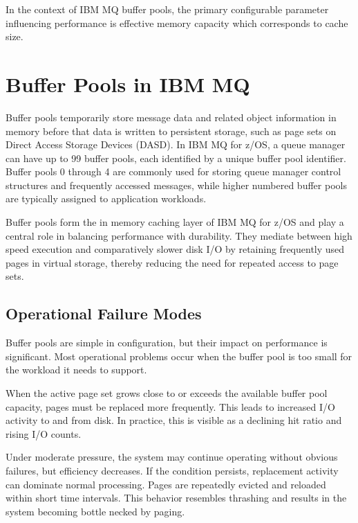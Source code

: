 In the context of IBM MQ buffer pools, the primary configurable parameter influencing performance is effective memory capacity which corresponds to cache size.

\section{Buffer Pools in IBM MQ}%
\label{sec:buffer-pools}


Buffer pools temporarily store message data and related object information in memory before that data is written to persistent storage, such as page sets on Direct Access Storage Devices (DASD). In IBM MQ for z/OS, a queue manager can have up to 99 buffer pools, each identified by a unique buffer pool identifier. Buffer pools 0 through 4 are commonly used for storing queue manager control structures and frequently accessed messages, while higher numbered buffer pools are typically assigned to application workloads.  \autocite{ibm2025_mq_bp}

Buffer pools form the in memory caching layer of IBM MQ for z/OS and play a central role in balancing performance with durability. They mediate between high speed execution and comparatively slower disk I/O by retaining frequently used pages in virtual storage, thereby reducing the need for repeated access to page sets.

\subsection{Operational Failure Modes}%
\label{subsec:failure-modes}

Buffer pools are simple in configuration, but their impact on performance is significant. Most operational problems occur when the buffer pool is too small for the workload it needs to support.

When the active page set grows close to or exceeds the available buffer pool capacity, pages must be replaced more frequently. This leads to increased I/O activity to and from disk. In practice, this is visible as a declining hit ratio and rising I/O counts.

Under moderate pressure, the system may continue operating without obvious failures, but efficiency decreases. If the condition persists, replacement activity can dominate normal processing. Pages are repeatedly evicted and reloaded within short time intervals. This behavior resembles thrashing and results in the system becoming bottle necked by paging. 

